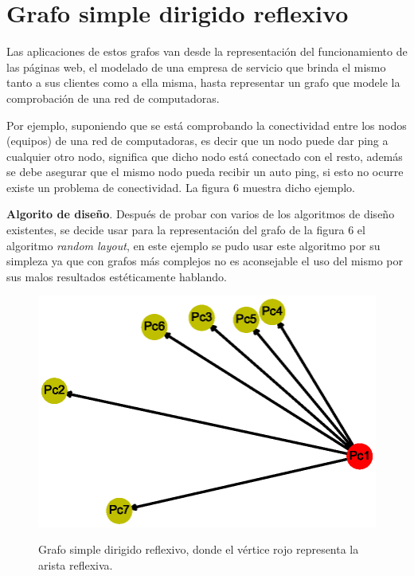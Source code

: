 \documentclass{article}
\begin{document}
\newpage

\section{Grafo simple dirigido reflexivo}

Las aplicaciones de estos grafos van desde la representación del funcionamiento de las páginas web, el modelado de una empresa de servicio que brinda el mismo tanto a sus clientes como a ella misma, hasta representar un grafo que modele la comprobación de una red de computadoras.\linebreak

Por ejemplo, suponiendo que se está comprobando la conectividad entre los nodos (equipos) de una red de computadoras, es decir que un nodo puede dar ping a cualquier otro nodo, significa que dicho nodo está conectado con el resto, además se debe asegurar que el mismo nodo pueda recibir un auto ping, si esto no ocurre existe un problema de conectividad. La figura 6 muestra dicho ejemplo.\linebreak

\textbf{Algorito de diseño}.\linebreak
Después de probar con varios de los algoritmos de diseño existentes, se decide usar para la representación del grafo de la figura 6 el algoritmo \textit{random layout}, en este ejemplo se pudo usar este algoritmo por su simpleza ya que con grafos más complejos no es aconsejable el uso del mismo por sus malos resultados estéticamente hablando.


\begin{center}

\end{center}
\begin{figure}[ht]
\begin{center}
\includegraphics[scale=0.7]{Graf6_random_layout.eps}\\
\caption{Grafo simple dirigido reflexivo, donde el vértice rojo representa la arista reflexiva.}
\end{center}
\end{figure}
\newpage
\end{document}
